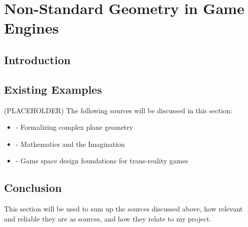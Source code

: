 \section{Non-Standard Geometry in Game Engines}
\label{lr:ne}

	\subsection{Introduction}
	\label{lr:ne:intro}
	
	\subsection{Existing Examples}
	\label{lr:ne:existing}
		(PLACEHOLDER) The following sources will be discussed in this section:
		\begin{itemize}
			\item \cite{Maric2014} - Formalizing complex plane geometry
			\item \cite{Turner2009} - Mathematics and the Imagination
			\item \cite{Lindley2005} - Game space design foundations for trans-reality games
		\end{itemize}
		
	\subsection{Conclusion}
	\label{lr:ne:conclusion}
		This section will be used to sum up the sources discussed above, how relevant and reliable they are as sources, and how they relate to my project.
		
